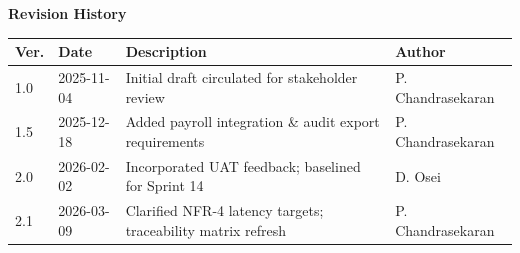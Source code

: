 \begin{titlepage}
\vspace{0.9cm}
\begin{center}
\begin{minipage}{0.85\textwidth}
\small
\begin{tcolorbox}[colback=lightgray,colframe=rulegray,boxrule=0.5pt,arc=1pt]
\textbf{Revision History}\\[2pt]
\begin{tabularx}{\linewidth}{@{}llXl@{}}
\toprule
\textbf{Ver.} & \textbf{Date} & \textbf{Description} & \textbf{Author} \\
\midrule
1.0 & 2025-11-04 & Initial draft circulated for stakeholder review & P. Chandrasekaran \\
1.5 & 2025-12-18 & Added payroll integration \& audit export requirements & P. Chandrasekaran \\
2.0 & 2026-02-02 & Incorporated UAT feedback; baselined for Sprint 14 & D. Osei \\
2.1 & 2026-03-09 & Clarified NFR-4 latency targets; traceability matrix refresh & P. Chandrasekaran \\
\bottomrule
\end{tabularx}
\end{tcolorbox}
\end{minipage}
\end{center}

\end{titlepage}
